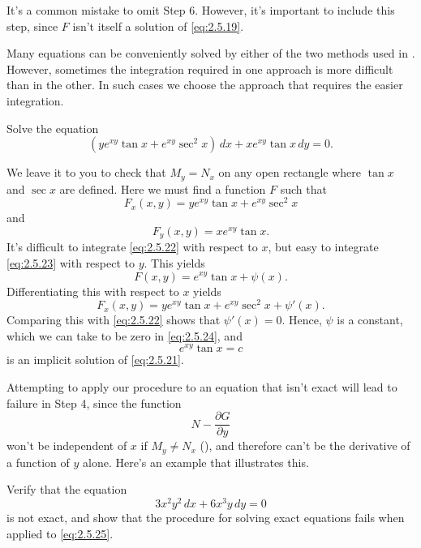 It's a common mistake to omit Step 6. However, it's important to
include this step, since $F$ isn't  itself a solution of
\eqref{eq:2.5.19}.

Many equations can be conveniently solved by either of the two methods
used in . However, sometimes the integration
required in one approach is  more difficult than in the
other. In such cases we choose the approach that requires the easier
integration.

\begin{example}\label{example:2.5.4}
 Solve the equation
\begin{equation}  \label{eq:2.5.21}
(ye^{xy} \tan x+e^{xy} \sec^2x)\,dx+xe^{xy} \tan x\,dy=0.
\end{equation}
\end{example}

\begin{solution}
We leave it to you to check that
$M_y=N_x$ on any open rectangle  where $\tan x$ and $\sec x$ are
defined. Here we must find a function $F$ such that
\begin{equation} \label{eq:2.5.22}
F_x(x,y)=ye^{xy} \tan x+e^{xy} \sec^2 x
\end{equation}
 and
\begin{equation}  \label{eq:2.5.23}
F_y(x,y)=xe^{xy} \tan x.
\end{equation}
 It's difficult to integrate \eqref{eq:2.5.22} with respect to $x$, but
easy to integrate \eqref{eq:2.5.23} with respect to $y$.  This yields
\begin{equation} \label{eq:2.5.24}
F(x,y)=e^{xy} \tan x+\psi (x).
\end{equation}
Differentiating this with respect to $x$ yields
\[
F_x(x,y)=ye^{xy}\tan x+e^{xy}\sec^2x+\psi'(x).
\]
 Comparing this with \eqref{eq:2.5.22} shows that  $\psi'(x)=0$.
Hence, $\psi$ is  a constant, which we can take to be zero in
\eqref{eq:2.5.24}, and
\[
e^{xy} \tan x=c
\]
is an implicit solution of \eqref{eq:2.5.21}.
\end{solution}

Attempting to apply our procedure to an equation that isn't  exact
will lead to failure in  Step 4, since the function
\[
 N-\frac{\partial G}{\partial y}
\]
won't be independent of $x$ if $M_y\ne N_x$
(), and therefore
can't be the derivative of a function of $y$ alone. Here's an example that
illustrates this.

\begin{example}\label{example:2.5.5}
 Verify that the equation
\begin{equation} \label{eq:2.5.25}
3x^2y^2\,dx+6x^3y\,dy=0
\end{equation}
is not exact, and show  that the procedure for solving exact equations
  fails when applied to \eqref{eq:2.5.25}.
\end{example}

